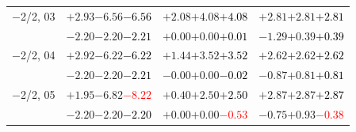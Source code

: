 \documentclass[compress]{beamer}
\begin{document}
\begin{frame}
\begin{tabular}{r | c | c | c}
$-$2/2, 03 & $+2.93$\hspace{0.1 cm}$-6.56$\hspace{0.1 cm}\textcolor{black}{$-6.56$} & $+2.08$\hspace{0.1 cm}$+4.08$\hspace{0.1 cm}\textcolor{black}{$+4.08$} & $+2.81$\hspace{0.1 cm}$+2.81$\hspace{0.1 cm}\textcolor{black}{$+2.81$} \\
           & $-2.20$\hspace{0.1 cm}$-2.20$\hspace{0.1 cm}\textcolor{black}{$-2.21$} & $+0.00$\hspace{0.1 cm}$+0.00$\hspace{0.1 cm}\textcolor{black}{$+0.01$} & $-1.29$\hspace{0.1 cm}$+0.39$\hspace{0.1 cm}\textcolor{black}{$+0.39$} \\
$-$2/2, 04 & $+2.92$\hspace{0.1 cm}$-6.22$\hspace{0.1 cm}\textcolor{black}{$-6.22$} & $+1.44$\hspace{0.1 cm}$+3.52$\hspace{0.1 cm}\textcolor{black}{$+3.52$} & $+2.62$\hspace{0.1 cm}$+2.62$\hspace{0.1 cm}\textcolor{black}{$+2.62$} \\
           & $-2.20$\hspace{0.1 cm}$-2.20$\hspace{0.1 cm}\textcolor{black}{$-2.21$} & $-0.00$\hspace{0.1 cm}$+0.00$\hspace{0.1 cm}\textcolor{black}{$-0.02$} & $-0.87$\hspace{0.1 cm}$+0.81$\hspace{0.1 cm}\textcolor{black}{$+0.81$} \\
$-$2/2, 05 & $+1.95$\hspace{0.1 cm}$-6.82$\hspace{0.1 cm}\textcolor{red}{$-8.22$} & $+0.40$\hspace{0.1 cm}$+2.50$\hspace{0.1 cm}\textcolor{black}{$+2.50$} & $+2.87$\hspace{0.1 cm}$+2.87$\hspace{0.1 cm}\textcolor{black}{$+2.87$} \\
           & $-2.20$\hspace{0.1 cm}$-2.20$\hspace{0.1 cm}\textcolor{black}{$-2.20$} & $+0.00$\hspace{0.1 cm}$+0.00$\hspace{0.1 cm}\textcolor{red}{$-0.53$} & $-0.75$\hspace{0.1 cm}$+0.93$\hspace{0.1 cm}\textcolor{red}{$-0.38$} \\

\end{tabular}
\end{frame}
\end{document}

